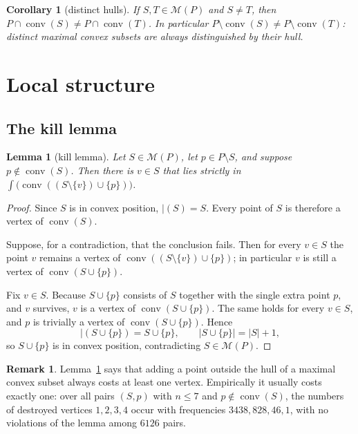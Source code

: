 \documentclass[11pt,a4paper]{article}
\newtheorem{lemma}[theorem]{Lemma}
\newtheorem{corollary}[theorem]{Corollary}
\theoremstyle{definition}
\newtheorem{remark}[theorem]{Remark}
\newcommand{\conv}{\operatorname{conv}}
\newcommand{\M}{\mathcal{M}}
\begin{document}
\begin{corollary}[distinct hulls]
\label{cor:distinct}
If $S,T\in\M(P)$ and $S\ne T$, then $P\cap\conv(S)\ne P\cap\conv(T)$.  In
particular $P\setminus\conv(S)\ne P\setminus\conv(T)$: distinct maximal convex
subsets are always distinguished by their hull.
\end{corollary}

\section{Local structure}
\label{sec:local}

\subsection{The kill lemma}

\begin{lemma}[kill lemma]
\label{lem:kill}
Let $S\in\M(P)$, let $p\in P\setminus S$, and suppose $p\notin\conv(S)$.  Then
there is $v\in S$ that lies strictly in $\int\bigl(\conv((S\setminus\{v\})\cup\{p\})\bigr)$.
\end{lemma}

\begin{proof}
Since $S$ is in convex position, $\vert(S)=S$.  Every point of $S$ is therefore a
vertex of $\conv(S)$.

Suppose, for a contradiction, that the conclusion fails.  Then for every $v\in S$
the point $v$ remains a vertex of $\conv((S\setminus\{v\})\cup\{p\})$; in
particular $v$ is still a vertex of $\conv(S\cup\{p\})$.

Fix $v\in S$.  Because $S\cup\{p\}$ consists of $S$ together with the single
extra point $p$, and $v$ survives, $v$ is a vertex of $\conv(S\cup\{p\})$.  The
same holds for every $v\in S$, and $p$ is trivially a vertex of
$\conv(S\cup\{p\})$.  Hence
\[
  \vert(S\cup\{p\})=S\cup\{p\},\qquad |S\cup\{p\}|=|S|+1,
\]
so $S\cup\{p\}$ is in convex position, contradicting $S\in\M(P)$.
\end{proof}

\begin{remark}
Lemma~\ref{lem:kill} says that adding a point outside the hull of a maximal
convex subset always costs at least one vertex.  Empirically it usually costs
exactly one: over all pairs $(S,p)$ with $n\le 7$ and $p\notin\conv(S)$, the
numbers of destroyed vertices $1,2,3,4$ occur with frequencies
$3438,828,46,1$, with no violations of the lemma among $6126$ pairs.
\end{remark}
\end{document}
